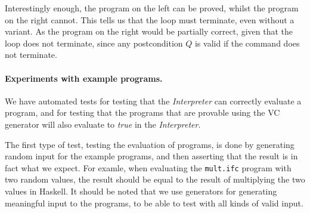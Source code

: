 \begin{itemize}
\begin{minipage}[t]{0.4\textwidth}
\begin{lstlisting}
\end{lstlisting}
\end{minipage}

  Interestingly enough, the program on the left can be proved, whilst the program on the right cannot. 
  This tells us that the loop must terminate, even without a variant. 
  As the program on the right would be partially correct, given that the loop does not terminate, since any postcondition $Q$ is valid if the command does not terminate.
\end{itemize}

\paragraph{Experiments with example programs.}
We have automated tests for testing that the \textit{Interpreter} can correctly evaluate a program,
and for testing that the programs that are provable using the VC generator will also evaluate to \textit{true} in the \textit{Interpreter}.

The first type of test, testing the evaluation of programs, is done by generating random input for the example programs, and then asserting that the result is in fact what we expect.
For examle, when evaluating the \texttt{mult.ifc} program with two random values, the result should be equal to the result of multiplying the two values in Haskell.
It should be noted that we use generators for generating meaningful input to the programs, to be able to test with all kinds of valid input.

